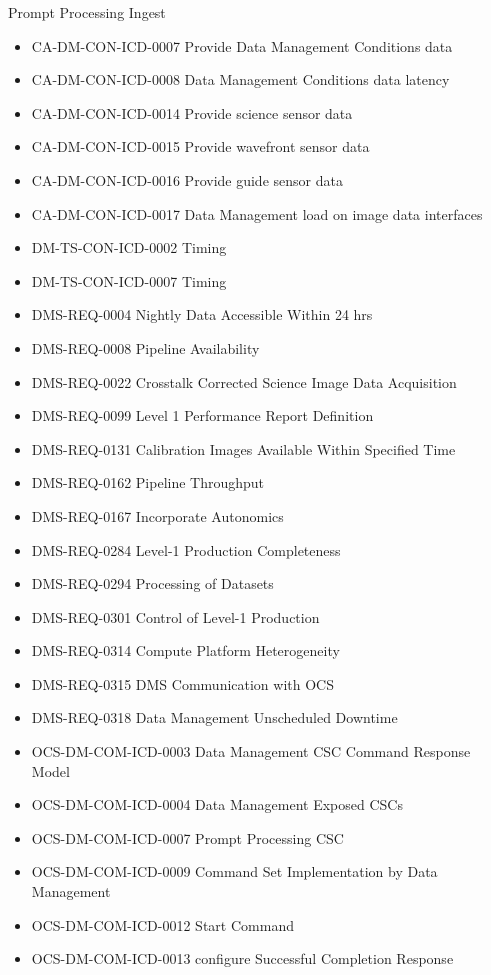 Prompt Processing Ingest \begin{itemize}
\item CA-DM-CON-ICD-0007 Provide Data Management Conditions data
\item CA-DM-CON-ICD-0008 Data Management Conditions data latency
\item CA-DM-CON-ICD-0014 Provide science sensor data
\item CA-DM-CON-ICD-0015 Provide wavefront sensor data
\item CA-DM-CON-ICD-0016 Provide guide sensor data
\item CA-DM-CON-ICD-0017 Data Management load on image data interfaces
\item DM-TS-CON-ICD-0002 Timing
\item DM-TS-CON-ICD-0007 Timing
\item DMS-REQ-0004 Nightly Data Accessible Within 24 hrs
\item DMS-REQ-0008 Pipeline Availability
\item DMS-REQ-0022 Crosstalk Corrected Science Image Data Acquisition
\item DMS-REQ-0099 Level 1 Performance Report Definition
\item DMS-REQ-0131 Calibration Images Available Within Specified Time
\item DMS-REQ-0162 Pipeline Throughput
\item DMS-REQ-0167 Incorporate Autonomics
\item DMS-REQ-0284 Level-1 Production Completeness
\item DMS-REQ-0294 Processing of Datasets
\item DMS-REQ-0301 Control of Level-1 Production
\item DMS-REQ-0314 Compute Platform Heterogeneity
\item DMS-REQ-0315 DMS Communication with OCS
\item DMS-REQ-0318 Data Management Unscheduled Downtime
\item OCS-DM-COM-ICD-0003 Data Management CSC Command Response Model
\item OCS-DM-COM-ICD-0004 Data Management Exposed CSCs
\item OCS-DM-COM-ICD-0007 Prompt Processing CSC
\item OCS-DM-COM-ICD-0009 Command Set Implementation by Data Management
\item OCS-DM-COM-ICD-0012 Start Command
\item OCS-DM-COM-ICD-0013 configure Successful Completion Response

\end{itemize}
